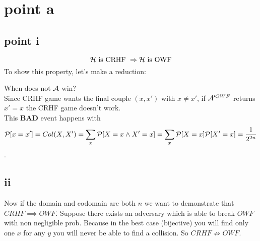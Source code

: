 
\section{point a}
\subsection{point i}%

\[
    \H \text{ is CRHF } \Rightarrow \H \text{ is OWF}
\]
To show this property, let's make a reduction:
\begin{figure}[h!]
   \centering
   \sdinit{}
\end{figure}

When does not $\A$ win?\\
Since CRHF game  wants the final couple $(x, x')$ with $x\not= x'$, if
$\A'^{OWF}$ returns $x'=x$ the CRHF game doesn't work.\\

This \textbf{BAD} event happens with 
\[
    \P [ x=x' ]=Col(X, X')=\sum_{x}^{} \P [ X=x \wedge X'=x ]= \sum_{x}^{} \P [X=x] \P [ X'=x ] = \frac{1}{2^{2n}}        
\].

\subsection{ii}%

Now if the domain and codomain are both $n$ we want to demonstrate that $CRHF\implies OWF$. Suppose there exists an adversary which is able to break $OWF$ with non negligible prob. Because in the best case (bijective) you will find only one $x$ for any $y$ you will never be able to find a collision. So $CRHF \not\Rightarrow OWF$.

